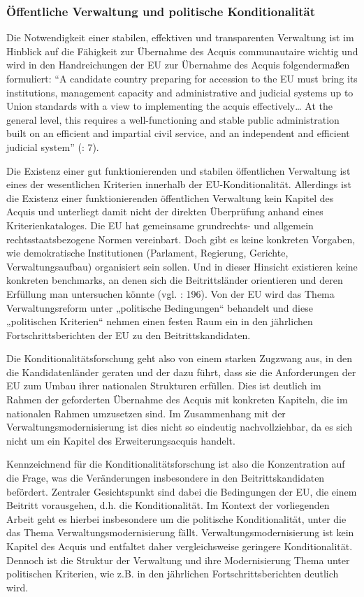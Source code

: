 \subsubsection{Öffentliche Verwaltung und politische Konditionalität}

Die Notwendigkeit einer stabilen, effektiven und transparenten Verwaltung ist im Hinblick auf die Fähigkeit zur Übernahme des Acquis communautaire wichtig und wird in den Handreichungen der EU zur Übernahme des Acquis folgendermaßen formuliert: “A candidate country preparing for accession to the EU must bring its institutions, management capacity and administrative and judicial systems up to Union standards with a view to implementing the acquis effectively… At the general level, this requires a well-functioning and stable public administration built on an efficient and impartial civil service, and an independent and efficient judicial system” (\cite{eurcom05}: 7).\par
Die Existenz einer gut funktionierenden und stabilen öffentlichen Verwaltung ist eines der wesentlichen Kriterien innerhalb der EU-Konditionalität. Allerdings ist die Existenz einer funktionierenden öffentlichen Verwaltung kein Kapitel des Acquis und unterliegt damit nicht der direkten Überprüfung anhand eines Kriterienkataloges. Die EU hat gemeinsame grundrechts- und allgemein rechtsstaatsbezogene Normen vereinbart. Doch gibt es keine konkreten Vorgaben, wie demokratische Institutionen (Parlament, Regierung, Gerichte, Verwaltungsaufbau) organisiert sein sollen. Und in dieser Hinsicht existieren keine konkreten benchmarks, an denen sich die Beitrittsländer orientieren und deren Erfüllung man untersuchen könnte (vgl. \cite{brusis09}: 196). Von der EU wird das Thema Verwaltungsreform unter „politische Bedingungen“ behandelt und diese „politischen Kriterien“ nehmen einen festen Raum ein in den jährlichen Fortschrittsberichten der EU zu den Beitrittskandidaten.\par
Die Konditionalitätsforschung geht also von einem starken Zugzwang aus, in den die Kandidatenländer geraten und der dazu führt, dass sie die Anforderungen der EU zum Umbau ihrer nationalen Strukturen erfüllen. Dies ist deutlich im Rahmen der geforderten Übernahme des Acquis mit konkreten Kapiteln, die im nationalen Rahmen umzusetzen sind. Im Zusammenhang mit der Verwaltungsmodernisierung ist dies nicht so eindeutig nachvollziehbar, da es sich nicht um ein Kapitel des Erweiterungsacquis handelt.\par
Kennzeichnend für die Konditionalitätsforschung ist also die Konzentration auf die Frage, was die Veränderungen insbesondere in den Beitrittskandidaten befördert. Zentraler Gesichtspunkt sind dabei die Bedingungen der EU, die einem Beitritt vorausgehen, d.h. die Konditionalität. Im Kontext der vorliegenden Arbeit geht es hierbei insbesondere um die politische Konditionalität, unter die das Thema Verwaltungsmodernisierung fällt. Verwaltungsmodernisierung ist kein Kapitel des Acquis und entfaltet daher vergleichsweise geringere Konditionalität. Dennoch ist die Struktur der Verwaltung und ihre Modernisierung Thema unter politischen Kriterien, wie z.B. in den jährlichen Fortschrittsberichten deutlich wird.\par
